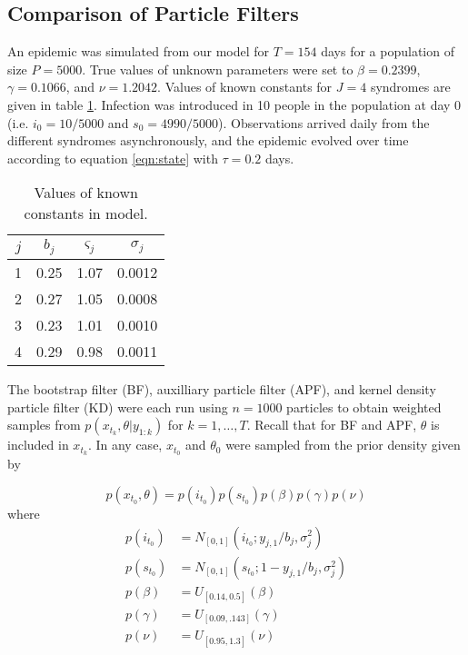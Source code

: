 \documentclass{article}
\begin{document}
\subsection{Comparison of Particle Filters}

An epidemic was simulated from our model for $T = 154$ days for a population of size $P = 5000$.  True values of unknown parameters were set to $\beta = 0.2399$, $\gamma = 0.1066$, and $\nu = 1.2042$.  Values of known constants for $J = 4$ syndromes are given in table \ref{tab:true}.  Infection was introduced in 10 people in the population at day 0 (i.e. $i_0 = 10/5000$ and $s_0 = 4990/5000$).  Observations arrived daily from the different syndromes asynchronously, and the epidemic evolved over time according to equation \eqref{eqn:state} with $\tau = 0.2$ days.

\begin{table}[ht]
\begin{center}
\caption{Values of known constants in model.} 
\label{tab:true}
\begin{tabular}{|cccc|}
\hline
$j$ & $b_j$ & $\varsigma_j$ & $\sigma_j$ \\
\hline
1 & 0.25 & 1.07 & 0.0012 \\
2 & 0.27 & 1.05 & 0.0008 \\
3 & 0.23 & 1.01 & 0.0010 \\
4 & 0.29 & 0.98 & 0.0011 \\
\hline
\end{tabular}
\end{center}
\end{table}

The bootstrap filter (BF), auxilliary particle filter (APF), and kernel density particle filter (KD) were each run using $n = 1000$ particles to obtain weighted samples from $p(x_{t_k},\theta|y_{1:k})$ for $k = 1,\ldots,T$.  Recall that for BF and APF, $\theta$ is included in $x_{t_k}$.  In any case, $x_{t_0}$ and $\theta_{0}$ were sampled from the prior density given by

\[p(x_{t_0},\theta) = p(i_{t_0})p(s_{t_0})p(\beta)p(\gamma)p(\nu)\] where
\begin{align*}
p(i_{t_0}) &= N_{[0,1]}(i_{t_0};y_{j,1}/b_j,\sigma^2_j) \\
p(s_{t_0}) &= N_{[0,1]}(s_{t_0};1 - y_{j,1}/b_j,\sigma^2_j) \\
p(\beta) &= U_{[0.14,0.5]}(\beta) \\
p(\gamma) &= U_{[0.09,.143]}(\gamma) \\
p(\nu) &= U_{[0.95,1.3]}(\nu)
\end{align*}
\end{document}
